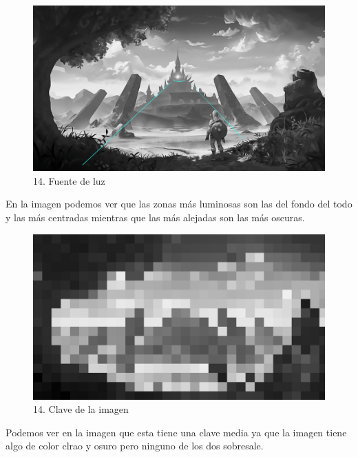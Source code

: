 \documentclass[12pt]{article}
\begin{document}
    \begin{figure}[H]
      \centering
      \includegraphics[width=\textwidth]{images/Selena/14_concept_arta.jpg}
      \caption{\small 14. Fuente de luz}
    \end{figure}
    En la imagen podemos ver que las zonas más luminosas son las del fondo del todo y las más centradas mientras que las más alejadas son las más oscuras.

    \begin{figure}[H]
      \centering
      \includegraphics[width=\textwidth]{images/Selena/14 pixelada.png}
      \caption{\small 14. Clave de la imagen}
    \end{figure}
    Podemos ver en la imagen que esta tiene una clave media ya que la imagen tiene algo de color clrao y osuro pero ninguno de los dos sobresale.
\end{document}
